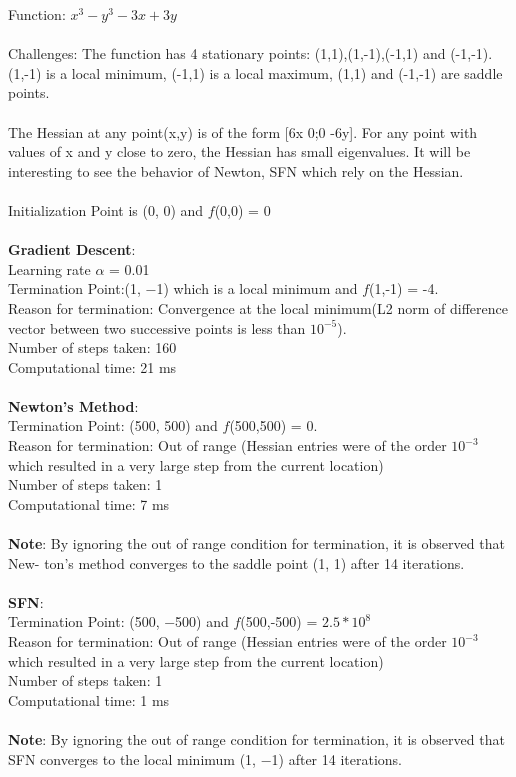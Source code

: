 
\newpage

Function: $x^3-y^3-3x+3y$
\\\\
Challenges: The function has 4 stationary points: (1,1),(1,-1),(-1,1) and (-1,-1). (1,-1) is a local minimum, (-1,1) is a local maximum, (1,1) and (-1,-1) are saddle points.
\\\\
The Hessian at any point(x,y) is of the form [6x 0;0 -6y]. For any point with values of x and y close to zero, the Hessian has small eigenvalues. It will be interesting to see the behavior of Newton, SFN which rely on the Hessian.
\\\\
Initialization Point is (0, 0) and $f$(0,0) = 0
\\\\
\textbf{Gradient Descent}: 
\\Learning rate $\alpha$ = 0.01
\\Termination Point:(1, −1) which is a local minimum and $f$(1,-1) = -4.
\\Reason for termination: Convergence at the local minimum(L2 norm of difference vector between two successive points is less than $10^{-5}$).
\\Number of steps taken: 160
\\Computational time: 21 ms
\\\\
\textbf{Newton’s Method}:
\\ Termination Point: (500, 500) and $f$(500,500) = 0.
\\Reason for termination: Out of range (Hessian entries were of the order $10^{-3}$ which resulted in a very large step from the current location)
\\Number of steps taken: 1
\\Computational time: 7 ms
\\\\
\textbf{Note}: By ignoring the out of range condition for termination, it is observed that New-
ton’s method converges to the saddle point (1, 1) after 14 iterations.
\\\\
\textbf{SFN}: 
\\Termination Point: (500, −500) and $f$(500,-500) = $2.5*10^8$
\\Reason for termination: Out of range (Hessian entries were of the order $10^{-3}$ which resulted in a very large step from the current location)
\\Number of steps taken: 1
\\Computational time: 1 ms
\\\\
\textbf{Note}: By ignoring the out of range condition for termination, it is observed that SFN converges to the local minimum (1, −1) after 14 iterations.


